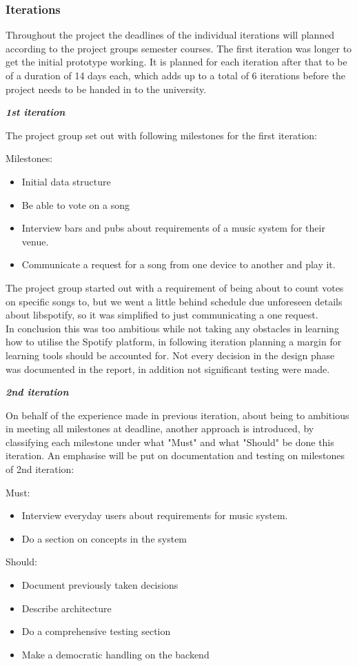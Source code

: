 \subsubsection{Iterations}

Throughout the project the deadlines of the individual iterations will planned according to the project groups semester courses. The first iteration was longer to get the initial prototype working. It is planned for each iteration after that to be of a duration of 14 days each, which adds up to a total of 6 iterations before the project needs to be handed in to the university.

\textit{\textbf{1st iteration}}

	The project group set out with following milestones for the first iteration:

	Milestones:
	\begin{itemize}
		\item Initial data structure
		\item Be able to vote on a song
		\item Interview bars and pubs about requirements of a music system for their venue.
		\item Communicate a request for a song from one device to another and play it.
	\end{itemize}

	The project group started out with a requirement of being about to count votes on specific songs to, but we went a little behind schedule due unforeseen details about libspotify, so it was simplified to just communicating a one request.\\
	In conclusion this was too ambitious while not taking any obstacles in learning how to utilise the Spotify platform, in following iteration planning a margin for learning tools should be accounted for. Not every decision in the design phase was documented in the report, in addition not significant testing were made.

\noindent\textit{\textbf{2nd iteration}}

	On behalf of the experience made in previous iteration, about being to ambitious in meeting all milestones at deadline, another approach is introduced, by classifying each milestone under what "Must" and what "Should" be done this iteration. An emphasise will be put on documentation and testing on milestones of 2nd iteration:

	Must:
	\begin{itemize}
		\item Interview everyday users about requirements for music system.
		\item Do a section on concepts in the system
	\end{itemize}

	Should:
	\begin{itemize}
		\item Document previously taken decisions
		\item Describe architecture
		\item Do a comprehensive testing section
		\item Make a democratic handling on the backend
	\end{itemize}